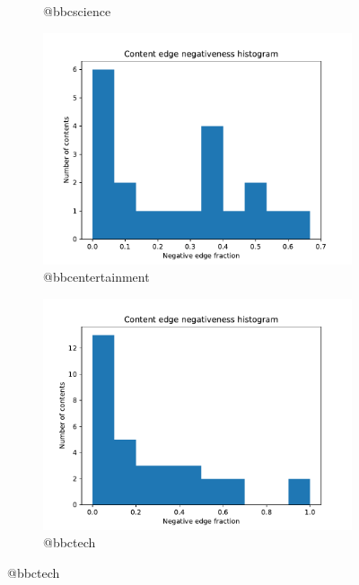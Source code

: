 \documentclass{beamer}
\begin{document}
\begin{frame}[c]
\begin{figure}
\begin{center}
\begin{subfigure}[b]{0.4\textwidth}
				\caption{@bbcscience}
				\label{fig:out/bbcscience200/neg-fraction-content-hist.pdf}
			\end{subfigure}
			\begin{subfigure}[b]{0.3\textwidth}
				\centering
				\includegraphics[width=\textwidth]{out/bbcentertainment200/neg-fraction-content-hist.pdf}
				\caption{@bbcentertainment}
				\label{fig:out/bbcscience200/neg-fraction-content-hist.pdf}
			\end{subfigure}
			\begin{subfigure}[b]{0.3\textwidth}
				\centering
				\includegraphics[width=\textwidth]{out/bbctech200/neg-fraction-content-hist.pdf}
				\caption{@bbctech}
				\label{fig:out/bbctech200/neg-fraction-content-hist.pdf}

\end{subfigure}
\end{center}
\end{figure}
\end{frame}
\end{document}
